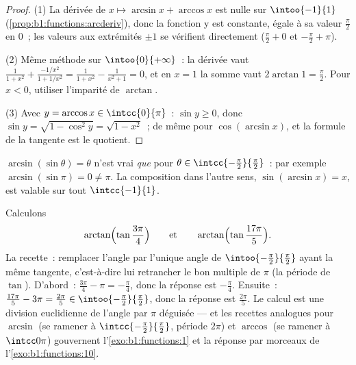 \begin{proof}
(1) La dérivée de $x \mapsto \arcsin x + \arccos x$ est nulle sur
$\intoo{-1}{1}$ (\cref{prop:b1:functions:arcderiv}), donc la fonction
y est constante, égale à sa valeur $\frac\pi2$ en $0$~; les valeurs
aux extrémités $\pm 1$ se vérifient directement ($\frac\pi2 + 0$ et
$-\frac\pi2 + \pi$).

(2) Même méthode sur $\intoo{0}{+\infty}$~: la dérivée vaut
$\frac{1}{1+x^2} + \frac{-1/x^2}{1 + 1/x^2} = \frac{1}{1+x^2} -
\frac{1}{x^2 + 1} = 0$, et en $x = 1$ la somme vaut $2\arctan 1 =
\frac\pi2$. Pour $x < 0$, utiliser l'imparité de $\arctan$.

(3) Avec $y = \arccos x \in \intcc{0}{\pi}$~: $\sin y \geq 0$, donc
$\sin y = \sqrt{1 - \cos^2 y} = \sqrt{1 - x^2}$~; de même pour
$\cos(\arcsin x)$, et la formule de la tangente est le quotient.
\end{proof}

\begin{remark}
$\arcsin(\sin\theta) = \theta$ n'est vrai \emph{que} pour $\theta \in
\intcc{-\frac\pi2}{\frac\pi2}$~: par exemple
$\arcsin(\sin\pi) = 0 \neq \pi$. La composition dans l'autre
sens, $\sin(\arcsin x) = x$, est valable sur tout
$\intcc{-1}{1}$.
\end{remark}

\begin{example}
\label{ex:b1:functions:wrap}
Calculons
\[
\arctan\Bigl(\tan\frac{3\pi}4\Bigr)
\qquad\text{et}\qquad
\arctan\Bigl(\tan\frac{17\pi}5\Bigr).
\]
La recette~: remplacer l'angle par l'unique angle de
$\intoo{-\frac\pi2}{\frac\pi2}$ ayant la même tangente, c'est-à-dire
lui retrancher le bon multiple de $\pi$ (la période de $\tan$).
D'abord~: $\frac{3\pi}4 - \pi = -\frac\pi4$, donc la réponse est
$-\frac\pi4$. Ensuite~: $\frac{17\pi} 5 - 3\pi = \frac{2\pi}5 \in
\intoo{-\frac\pi2}{\frac\pi2}$, donc la réponse est $\frac{2\pi}5$.
Le calcul est une division euclidienne de l'angle par $\pi$ déguisée
--- et les recettes analogues pour $\arcsin$ (se ramener à
$\intcc{-\frac\pi2}{\frac\pi2}$, période $2\pi$) et $\arccos$
(se ramener à $\intcc0\pi$) gouvernent l'\cref{exo:b1:functions:1} et
la réponse par morceaux de l'\cref{exo:b1:functions:10}.
\end{example}

